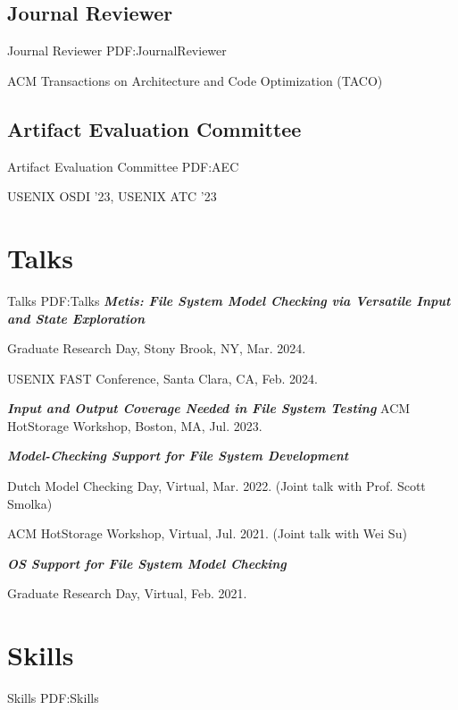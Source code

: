 \documentclass[letterpaper,10pt,oneside]{article}
\begin{document}
\begin{body}
\subsection
{Journal Reviewer}
{Journal Reviewer}
{PDF:JournalReviewer}

\BulletItem
ACM Transactions on Architecture and Code Optimization (TACO)

\subsection
{Artifact Evaluation Committee}
{Artifact Evaluation Committee}
{PDF:AEC}

\BulletItem
USENIX OSDI '23, USENIX ATC '23

\section
{Talks}
{Talks}
{PDF:Talks}
\BulletItem
\textbf{\textit{Metis: File System Model Checking via Versatile Input and State Exploration}}

\SubBulletItem
Graduate Research Day, Stony Brook, NY, Mar. 2024.

\SubBulletItem
USENIX FAST Conference, Santa Clara, CA, Feb. 2024.

\GapNoBreak

\BulletItem
\textbf{\textit{Input and Output Coverage Needed in File System Testing}}
\SubBulletItem
ACM HotStorage Workshop, Boston, MA, Jul. 2023.

\GapNoBreak

\BulletItem
\textbf{\textit{Model-Checking Support for File System Development}}

\SubBulletItem
Dutch Model Checking Day, Virtual, Mar. 2022. (Joint talk with Prof. Scott Smolka)

\SubBulletItem
ACM HotStorage Workshop, Virtual, Jul. 2021. (Joint talk with Wei Su)

\GapNoBreak

\BulletItem
\textbf{\textit{OS Support for File System Model Checking}}

\SubBulletItem
Graduate Research Day, Virtual, Feb. 2021.



\section
{Skills}
{Skills}
{PDF:Skills}


\end{body}
\end{document}
